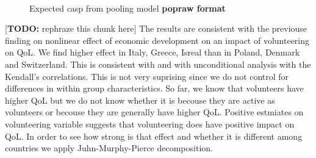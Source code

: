 \documentclass[10pt, letterpaper]{article}
\begin{document}
\begin{spacing}{1.4}
\begin{figure}[H]
\centering
\caption{Expected casp from pooling model \textbf{popraw format}} 
\label{fig:pooling1}
\begin{minipage}{1\linewidth}
\quad
{}~\\

\end{minipage}
\end{figure}


[{\bf TODO:} rephraze this chunk here] 
The results are consistent with the previouse finding on nonlinear effect of economic development on an impact of volunteering on QoL. We find higher effect in Italy, Greece, Isreal than in Poland, Denmark and Switzerland. This  is consistent with \citet{haski09} and with unconditional analysis with the Kendall's correlations. This is not very suprising since we do not control for differences in within group characteristics. So far, we know that volunteers have higher QoL but we do not know whether it is becouse they are active as volunteers or becouse they are generally have higher QoL. Positive estmiates on volunteering variable suggests that volunteering does have positive impact on QoL. In order to see how strong is that effect and whether it is different among countries we apply Juhn-Murphy-Pierce decomposition. 


\end{spacing}
\end{document}

